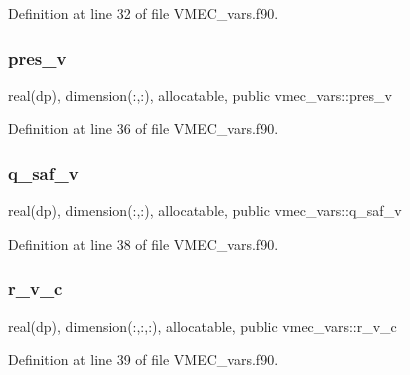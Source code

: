 Definition at line 32 of file V\+M\+E\+C\+\_\+vars.\+f90.

\mbox{\label{namespacevmec__vars_a958baf9fece8a4a001b6d8d767b48179}} 
\subsubsection{\texorpdfstring{pres\+\_\+v}{pres\_v}}
{\footnotesize\ttfamily real(dp), dimension(\+:,\+:), allocatable, public vmec\+\_\+vars\+::pres\+\_\+v}



Definition at line 36 of file V\+M\+E\+C\+\_\+vars.\+f90.

\mbox{\label{namespacevmec__vars_a08f3862b0bb940623a416a056f03b092}} 
\subsubsection{\texorpdfstring{q\+\_\+saf\+\_\+v}{q\_saf\_v}}
{\footnotesize\ttfamily real(dp), dimension(\+:,\+:), allocatable, public vmec\+\_\+vars\+::q\+\_\+saf\+\_\+v}



Definition at line 38 of file V\+M\+E\+C\+\_\+vars.\+f90.

\mbox{\label{namespacevmec__vars_a8307a4a411dadf5b9be24f8aafac5f39}} 
\subsubsection{\texorpdfstring{r\+\_\+v\+\_\+c}{r\_v\_c}}
{\footnotesize\ttfamily real(dp), dimension(\+:,\+:,\+:), allocatable, public vmec\+\_\+vars\+::r\+\_\+v\+\_\+c}



Definition at line 39 of file V\+M\+E\+C\+\_\+vars.\+f90.

\mbox{\label{namespacevmec__vars_ac6cdafd632e37856533c42e8ab34a680}} 
